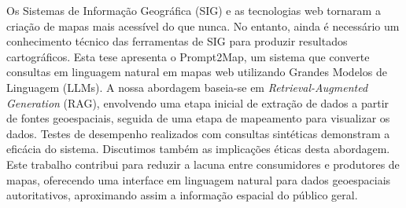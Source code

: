
%

Os Sistemas de Informação Geográfica (SIG) e as tecnologias web tornaram a criação de mapas mais acessível do que nunca. No entanto, ainda é necessário um conhecimento técnico das ferramentas de SIG para produzir resultados cartográficos.
Esta tese apresenta o Prompt2Map, um sistema que converte consultas em linguagem natural em mapas web utilizando Grandes Modelos de Linguagem (LLMs).
A nossa abordagem baseia-se em \textit{Retrieval-Augmented Generation} (RAG), envolvendo uma etapa inicial de extração de dados a partir de fontes geoespaciais, seguida de uma etapa de mapeamento para visualizar os dados.
Testes de desempenho realizados com consultas sintéticas demonstram a eficácia do sistema.
Discutimos também as implicações éticas desta abordagem.
Este trabalho contribui para reduzir a lacuna entre consumidores e produtores de mapas, oferecendo uma interface em linguagem natural para dados geoespaciais autoritativos, aproximando assim a informação espacial do público geral.

